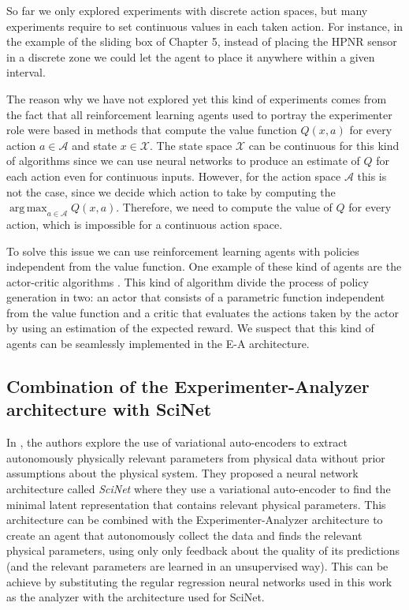 \documentclass[11pt,a4paper,twoside]{report}
\DeclareMathOperator*{\argmax}{arg\,max}
\newcommand{\+}{\textnormal{+} }
\theoremstyle{definition}
\numberwithin{equation}{chapter}
\begin{document}
So far we only explored experiments with discrete action spaces, but many
experiments require to set continuous values in each taken action.
For instance, in the example of the sliding box of Chapter 5, instead of placing 
the HPNR sensor in a discrete zone we could let the agent to place it anywhere
within a given interval. 

The reason why we have not explored yet this kind of experiments comes from the
fact that all reinforcement learning agents used to portray the experimenter
role were based in methods that compute the value function $Q(x,a)$ for every
action $a\in \mathcal{A}$ and state $x \in \mathcal{X}$. The state space
$\mathcal{X}$ can be continuous for this kind of algorithms since we can use
neural networks to produce an estimate of $Q$ for each action even for
continuous inputs. However, for the action space $\mathcal{A}$ this is not the
case, since we decide which action to take by computing the $\argmax_{a \in
\mathcal{A}} Q(x,a)$. Therefore, we need to compute the value of $Q$ for every
action, which is impossible for a continuous action space. \par To solve this
issue we can use reinforcement learning agents with policies independent from
the value function. One example of these kind of agents are the actor-critic
algorithms \cite{konda2000actor}. This kind of algorithm divide the
process of policy generation in two: an actor that consists of a parametric
function independent from the value function and a critic that evaluates the
actions taken by the actor by using an estimation of the expected reward. We
suspect that this kind of agents can be seamlessly implemented in the E-A
architecture.

\subsection{Combination of the Experimenter-Analyzer architecture with SciNet}

In \cite{iten2020discovering}, the authors explore the use of variational
auto-encoders to extract autonomously physically relevant parameters from
physical data without prior assumptions about the physical system. They proposed
a neural network architecture called \textit{SciNet} where they use a
variational auto-encoder to find the minimal latent representation that contains
relevant physical parameters. This architecture can be combined with the
Experimenter-Analyzer architecture to create an agent that autonomously collect
the data and finds the relevant physical parameters, using only only feedback
about the quality of its predictions (and the relevant parameters are learned in
an unsupervised way). This can be achieve by substituting the regular regression
neural networks used in this work as the analyzer with the architecture used for
SciNet.
\end{document}
